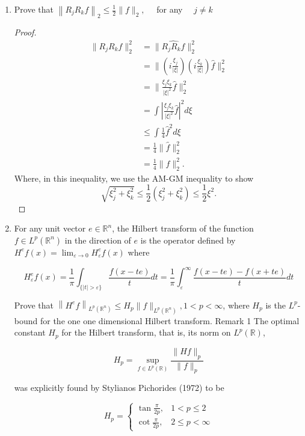 
\begin{enumerate}
	\item Prove that
$\left\|R_j R_k f\right\|_2 \leq \frac{1}{2}\|f\|_2, \quad$ for any $\quad j \neq k$

\begin{proof}
	\begin{align*}
		\|R_j R_k f\|_2^2
		&= \|\widehat{R_j R_k f}\|_2^2 \\
		&= \|(i \frac{\xi_j}{|\xi|})(i \frac{\xi_k}{|\xi|}) \hat{f} \|_2^2 \\
		&= \|\frac{\xi_j\xi_k}{|\xi|^2} \hat{f} \|_2^2 \\
		&= \int \left| \frac{\xi_j \xi_k}{|\xi|^2} \hat{f} \right|^2 d \xi  \\
		&\leq \int \frac{1}{4} \hat{f} ^2 d \xi \\
		&= \frac{1}{4} \|\hat{f} \|_2^2 \\
		&= \frac{1}{4} \|f \|_2^2
	.\end{align*}
	Where, in this inequality, we use the AM-GM inequality to show
	\[
		\sqrt{\xi_j^2 + \xi_k^2} 
		\le \frac{1}{2} (\xi_j^2 + \xi_k^2) \le \frac{1}{2} \xi^2
	.\] 
\end{proof}

\item 
	For any unit vector $e \in \mathbb{R}^n$, the Hilbert transform of the function $f \in L^p\left(\mathbb{R}^n\right)$ in the direction of $e$ is the operator defined by $H^e f(x)=\lim _{\varepsilon \rightarrow 0} H_{\varepsilon}^e f(x)$ where

\[
H_{\varepsilon}^e f(x)=\frac{1}{\pi} \int_{\{|t|>\varepsilon\}} \frac{f(x-t e)}{t} d t=\frac{1}{\pi} \int_{\varepsilon}^{\infty} \frac{f(x-t e)-f(x+t e)}{t} d t
\]


Prove that $\left\|H^e f\right\|_{L^p\left(\mathbb{R}^n\right)} \leq H_p\|f\|_{L^p\left(\mathbb{R}^n\right)}, 1<p<\infty$, where $H_p$ is the $L^p$-bound for the one one dimensional Hilbert transform.
Remark 1 The optimal constant $H_p$ for the Hilbert transform, that is, its norm on $L^p(\mathbb{R})$,

\[
H_p=\sup _{f \in L^p(\mathbb{R})} \frac{\|H f\|_p}{\|f\|_p}
\]

was explicitly found by Stylianos Pichorides (1972) to be

\[
H_p= \begin{cases}\tan \frac{\pi}{2 p}, & 1<p \leq 2 \\ \cot \frac{\pi}{2 p}, & 2 \leq p<\infty\end{cases}
\]



\end{enumerate}
